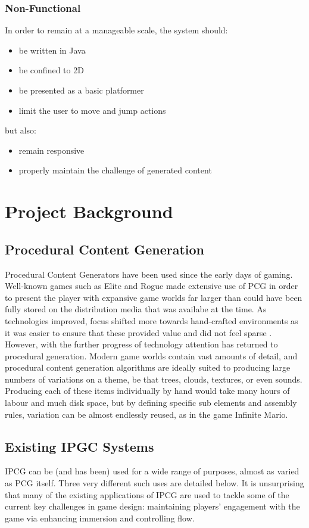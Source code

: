 \documentclass[a4paper,oneside,12pt,openany]{memoir}
\begin{document}
\subsection{Non-Functional}
In order to remain at a manageable scale, the system should:
\begin{itemize}[-]
\item be written in Java
\item be confined to 2D
\item be presented as a basic platformer
\item limit the user to move and jump actions
\end{itemize}
but also:
\begin{itemize}[-]
  \item remain responsive
  \item properly maintain the challenge of generated content
\end{itemize}

\chapter{Project Background}
\section{Procedural Content Generation}
Procedural Content Generators have been used since the early days of gaming. Well-known games such as Elite and Rogue\cite{rogue} made extensive use of PCG in order to present the player with expansive game worlds far larger than could have been fully stored on the distribution media that was availabe at the time. As technologies improved, focus shifted more towards hand-crafted environments as it was easier to ensure that these provided value and did not feel sparse \cite{charbitat}. However, with the further progress of technology attention has returned to procedural generation. Modern game worlds contain vast amounts of detail, and procedural content generation algorithms are ideally suited to producing large numbers of variations on a theme, be that trees, clouds, textures, or even sounds. Producing each of these items individually by hand would take many hours of labour and much disk space, but by defining specific sub elements and assembly rules, variation can be almost endlessly reused, as in the game Infinite Mario\cite{mario}.

\section{Existing IPGC Systems}
IPCG can be (and has been) used for a wide range of purposes, almost as varied as PCG itself. Three very different such uses are detailed below. It is unsurprising that many of the existing applications of IPCG are used to tackle some of the current key challenges in game design: maintaining players' engagement with the game via enhancing immersion and controlling flow\cite{flow}. 
\end{document}
